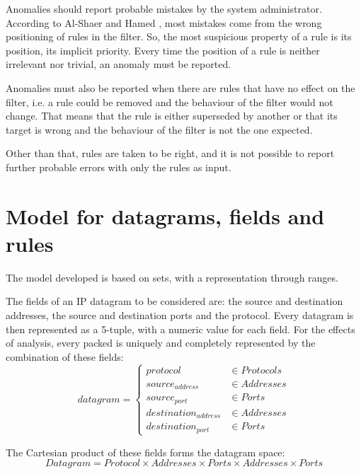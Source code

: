 Anomalies should report probable mistakes by the system administrator. According
to Al-Shaer and Hamed \cite{AlSHam-Fpa-03}, most mistakes come from the wrong positioning of rules
in the filter. So, the most suspicious property of a rule is its position,
its implicit priority. Every time the position of a rule is
neither irrelevant nor trivial, an anomaly must be reported.

Anomalies must also be reported when there are rules that have no effect
on the filter, i.e. a rule could be removed and the behaviour of the filter
would not change. That means that the rule is either superseded by another or
that its target is wrong and the behaviour of the filter is not the one
expected.

Other than that, rules are taken to be right, and it is not possible to report
further probable errors with only the rules as input.



\section{Model for datagrams, fields and rules}

The model developed is based on sets, with a representation through ranges.

The fields of an IP datagram to be considered are: the source and destination
addresses, the source and destination ports and the protocol. Every datagram is
then represented as a 5-tuple, with a numeric value for each field. For the
effects of analysis, every packed is uniquely and completely represented by the
combination of these fields:
\begin{equation*}
	datagram =
	\begin{cases}
		protocol & \in Protocols \\
		source_{address} & \in Addresses \\
		source_{port} & \in Ports \\
		destination_{address} & \in Addresses \\
		destination_{port} & \in Ports
	\end{cases}
\end{equation*}

The Cartesian product of these fields forms the datagram space:
\begin{equation*}
	Datagram = Protocol \times Addresses \times Ports \times Addresses \times Ports
\end{equation*}

